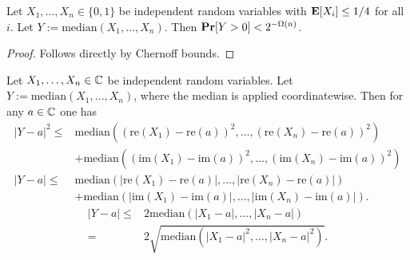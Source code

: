 \begin{lemma}\label{lm:quant-01}
Let $X_1,\ldots, X_n\in \{0, 1\}$ be independent random variables with ${\bf \mbox{\bf E}}[X_i] \leq 1/4$ for all $i$. Let $Y:=\text{median} (X_1,\ldots, X_n)$. Then 
${\bf \mbox{\bf Pr}}[Y>0]<2^{-\Omega(n)}$.
\end{lemma}
\begin{proof}
Follows directly by Chernoff bounds.
\end{proof}
\fi

\begin{lemma}\label{lm:median-est}
Let $X_1,\ldots, X_n\in \mathbb{C}$ be independent random variables. Let $Y:=\text{median} (X_1,\ldots, X_n)$, where the median is applied coordinatewise. Then for any $a\in \mathbb{C}$ one has
\begin{equation*}
\begin{split}
|Y-a|^2\leq &\text{median} ((\text{re}(X_1)-\text{re}(a))^2,\ldots, (\text{re}(X_n)-\text{re}(a))^2)\\
&+\text{median} ((\text{im}(X_1)-\text{im}(a))^2,\ldots, (\text{im}(X_n)-\text{im}(a))^2)\\
|Y-a|\leq &\text{median}(|\text{re}(X_1)-\text{re}(a)|,\ldots, |\text{re}(X_n)-\text{re}(a)|)\\
&+\text{median} (|\text{im}(X_1)-\text{im}(a)|,\ldots, |\text{im}(X_n)-\text{im}(a)|).
\end{split}
\end{equation*}
\fi
\begin{equation*}
\begin{split}
|Y-a|\leq &2\text{median}(|X_1-a|,\ldots, |X_n-a|)\\
= &2\sqrt{\text{median}(|X_1-a|^2,\ldots, |X_n-a|^2)}.\\
\end{split}
\end{equation*}

\end{lemma}
